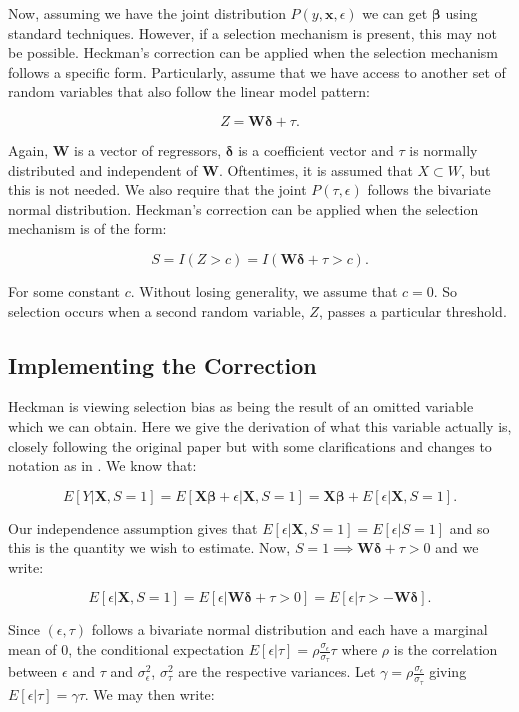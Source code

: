 \documentclass[12pt,twoside]{reedthesis}
\theoremstyle{definition}
\begin{document}
Now, assuming we have the joint distribution $P(y, \mathbf{x}, \epsilon)$ we can get $\mathbf{\beta}$ using standard techniques. However, if a selection mechanism is present, this may not be possible. Heckman's correction can be applied when the selection mechanism follows a specific form. Particularly, assume that we have access to another set of random variables that also follow the linear model pattern: 

$$Z = \mathbf{W} \boldsymbol{\delta} + \tau.$$

Again, $\mathbf{W}$ is a vector of regressors, $\boldsymbol{\delta}$ is a coefficient vector and $\tau$ is normally distributed and independent of $\mathbf{W}$. Oftentimes, it is assumed that $X \subset W$, but this is not needed. We also require that the joint $P(\tau, \epsilon)$ follows the bivariate normal distribution. Heckman's correction can be applied when the selection mechanism is of the form:

$$S = I(Z > c) = I( \mathbf{W} \boldsymbol{\delta} + \tau > c).$$ 

For some constant $c$. Without losing generality, we assume that $c = 0$. So selection occurs when a second random variable, $Z$,  passes a particular threshold. 

\subsection{Implementing the Correction}

Heckman is viewing selection bias as being the result of an omitted variable which we can obtain. Here we give the derivation of what this variable actually is, closely following the original paper but with some clarifications and changes to notation as in \citep{Jin}. We know that:

$$E[Y | \mathbf{X}, S = 1] = E[ \mathbf{X} \boldsymbol{\beta} + \epsilon | \mathbf{X}, S = 1] = \mathbf{X} \boldsymbol{\beta} + E[\epsilon |  \mathbf{X}, S = 1].$$

Our independence assumption gives that $ E[\epsilon |  \mathbf{X}, S = 1] =  E[\epsilon |  S = 1]$ and so this is the quantity we wish to estimate. Now, $S=1 \implies  \mathbf{W} \boldsymbol{\delta} + \tau > 0$ and we write:  

$$E[\epsilon |  \mathbf{X}, S = 1] = E[\epsilon | \mathbf{W} \boldsymbol{\delta}+ \tau > 0] = E[\epsilon |  \tau > - \mathbf{W} \boldsymbol{\delta}].$$

Since $(\epsilon, \tau)$ follows a bivariate normal distribution and each have a marginal mean of $0$, the conditional expectation $E[\epsilon | \tau] = \rho \frac{\sigma_{\epsilon}}{\sigma_{\tau}} \tau$ where $\rho$ is the correlation between $\epsilon$ and $\tau$ and $\sigma^2_{\epsilon}$, $\sigma^2_{\tau}$ are the respective variances. Let $\gamma  = \rho \frac{\sigma_{\epsilon}}{\sigma_{\tau}}$ giving $E[\epsilon | \tau] = \gamma \tau$. We may then write:	
\end{document}
